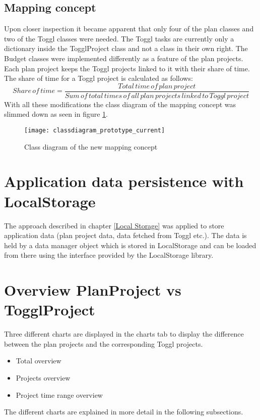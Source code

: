 \subsection{Mapping concept} \label{Mapping_result}
Upon closer inspection it became apparent that only four of the plan classes and two of the Toggl classes were needed. The Toggl tasks are currently only a dictionary inside the TogglProject class and not a class in their own right. The Budget classes were implemented differently as a feature of the plan projects. Each plan project keeps the Toggl projects linked to it with their share of time. The share of time for a Toggl project is calculated as follows:
\begin{equation}
	Share \, of \, time = \frac{Total \, time \, of \, plan \, project}{Sum \, of \, total \, times \, of \, all \, plan \, projects \, linked \, to \, Toggl \, project}
\end{equation}
With all these modifications the class diagram of the mapping concept was slimmed down as seen in figure \ref{classdiagram_prototype_current}.
\begin{figure}[H]
	\centering
	\texttt{[image: classdiagram\_prototype\_current]}
	\caption{Class diagram of the new mapping concept}
	\label{classdiagram_prototype_current}
\end{figure}

\section{Application data persistence with LocalStorage}
The approach described in chapter \ref{Local Storage} was applied to store application data (plan project data, data fetched from Toggl etc.). The data is held by a data manager object which is stored in LocalStorage and can be loaded from there using the interface provided by the LocalStorage library.

\section{Overview PlanProject vs TogglProject} \label{Graphical overview}
Three different charts are displayed in the charts tab to display the difference between the plan projects and the corresponding Toggl projects.
\begin{itemize}
	\item Total overview
	\item Projects overview
	\item Project time range overview
\end{itemize}
The different charts are explained in more detail in the following subsections.

